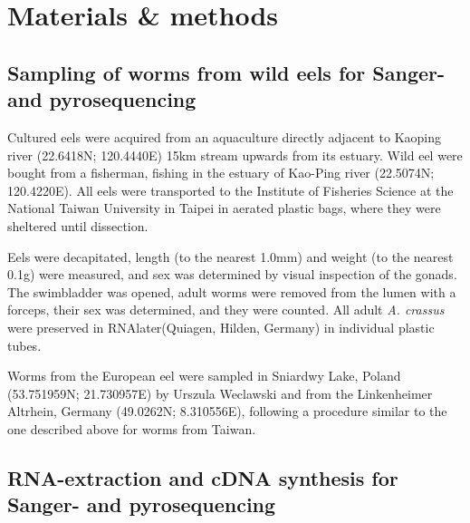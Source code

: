 

\chapter{Materials \& methods} %



\ifpdf
    \graphicspath{{8/figures/PNG/}{8/figures/PDF/}{8/figures/}}
\else
    \graphicspath{{8/figures/EPS/}{8/figures/}}
\fi



\section{Sampling of worms from wild eels for Sanger- and
  pyrosequencing}

Cultured eels were acquired from an aquaculture directly adjacent to
Kaoping river (22.6418N; 120.4440E) 15km stream upwards from its
estuary. Wild eel were bought from a fisherman, fishing in the estuary
of Kao-Ping river (22.5074N; 120.4220E). All eels were transported to
the Institute of Fisheries Science at the National Taiwan University
in Taipei in aerated plastic bags, where they were sheltered until
dissection.

Eels were decapitated, length (to the nearest 1.0mm) and weight (to
the nearest 0.1g) were measured, and sex was determined by visual
inspection of the gonads. The swimbladder was opened, adult worms were
removed from the lumen with a forceps, their sex was determined, and
they were counted. All adult \textit{A. crassus} were preserved in
RNAlater(Quiagen, Hilden, Germany) in individual plastic tubes.

Worms from the European eel were sampled in Sniardwy Lake, Poland
(53.751959N; 21.730957E) by Urszula Weclawski and from the
Linkenheimer Altrhein, Germany (49.0262N; 8.310556E), following a
procedure similar to the one described above for worms from Taiwan.

\section{RNA-extraction and cDNA synthesis for Sanger- and
  pyrosequencing}


